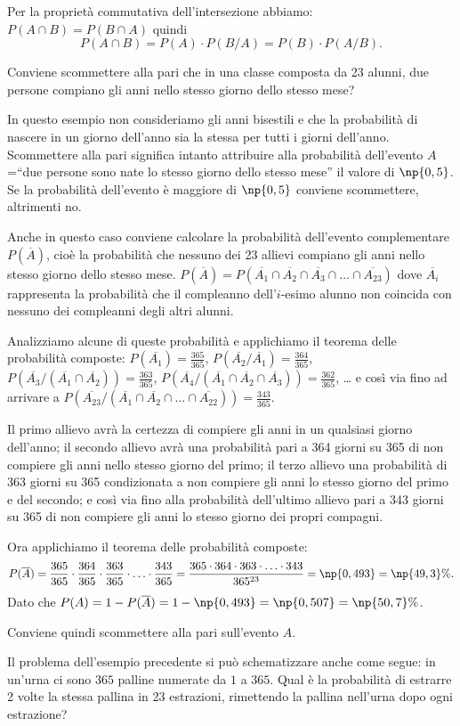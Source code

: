 Per la proprietà commutativa dell'intersezione abbiamo: $P(A\cap B)=P(B\cap A)$ quindi 
\[P(A\cap B)=P(A)\cdot P(B/A)=P(B)\cdot P(A/B).\]
\pagebreak
\begin{exrig}
\begin{esempio}
Conviene scommettere alla pari che in una classe composta da 23 alunni, due persone compiano gli anni nello stesso giorno dello stesso mese?

In questo esempio non consideriamo gli anni bisestili e che la probabilità di nascere in un giorno dell'anno sia la stessa per tutti i giorni dell'anno. Scommettere alla pari significa intanto attribuire alla probabilità dell'evento $A$=``due persone sono nate lo stesso giorno dello stesso mese'' il valore di $\np{0,5}$. Se la probabilità dell'evento è maggiore di $\np{0,5}$ conviene scommettere, altrimenti no.

Anche in questo caso conviene calcolare la probabilità dell'evento complementare $P(\overline A)$, cioè la probabilità che nessuno dei 23 allievi compiano gli anni nello stesso giorno dello stesso mese. $P(\overline A)=P(\overline{A_1}\cap \overline{A_2}\cap \overline{A_3}\cap\ldots \cap \overline{A_{23}})$ dove $\overline{A_i}$ rappresenta la probabilità che il compleanno dell'$i$-esimo alunno non coincida con nessuno dei compleanni degli altri alunni.

Analizziamo alcune di queste probabilità e applichiamo il teorema delle probabilità composte: $P(\overline{A_1})=\frac{365}{365}$, $P(\overline {A_2}/\overline{A_1})=\frac{364}{365}$, $P(\overline{A_3}/(\overline{A_1}\cap \overline{A_2}))=\frac{363}{365}$, $P(\overline{A_4}/(\overline{A_1}\cap \overline{A_2}\cap \overline{A_3}))=\frac{362}{365}$, \ldots{} e così via fino ad arrivare a $P(\overline{A_{23}}/(\overline{A_1}\cap \overline{A_2}\cap \ldots \cap \overline{A_{22}}))=\frac{343}{365}$.

Il primo allievo avrà la certezza di compiere gli anni in un qualsiasi giorno dell'anno; il secondo allievo avrà una probabilità pari a 364 giorni su 365 di non compiere gli anni nello stesso giorno del primo; il terzo allievo una probabilità di 363 giorni su 365 condizionata a non compiere gli anni lo stesso giorno del primo e del secondo; e così via fino alla probabilità dell'ultimo allievo pari a 343 giorni su 365 di non compiere gli anni lo stesso giorno dei propri compagni.

Ora applichiamo il teorema delle probabilità composte: \[ P(\overline A)=\frac{365}{365}\cdot \frac{364}{365}\cdot \frac{363}{365}\cdot \ldots \cdot \frac{343}{365}=\frac{365\cdot 364\cdot 363\cdot \ldots \cdot 343}{365^{23}}=\np{0,493}=\np{49,3}\%.\] Dato che $P(A)=1-P(\overline A)=1-\np{0,493}=\np{0,507}=\np{50,7}\%$.

Conviene quindi scommettere alla pari sull'evento $A$.
\end{esempio}
\end{exrig}
Il problema dell'esempio precedente si può schematizzare anche come segue: in un'urna ci sono $365$ palline numerate da $1$ a $365$. Qual è la probabilità di estrarre 2 volte la stessa pallina in 23 estrazioni, rimettendo la pallina nell'urna dopo ogni estrazione?

\vspazio\ovalbox{\risolvii \ref{ese:9.59}, \ref{ese:9.60}, \ref{ese:9.61}, \ref{ese:9.62}, \ref{ese:9.63}}
\newpage

\cleardoublepage
